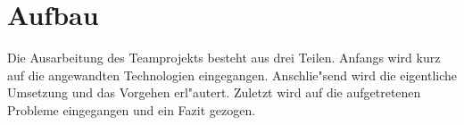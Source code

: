 \section{Aufbau}
\label {sec:aufbau}
Die Ausarbeitung des Teamprojekts besteht aus drei Teilen.\newline
Anfangs wird kurz auf die angewandten Technologien eingegangen.
Anschlie"send wird die eigentliche Umsetzung und das Vorgehen erl"autert. Zuletzt wird auf die aufgetretenen Probleme eingegangen und ein Fazit gezogen.
